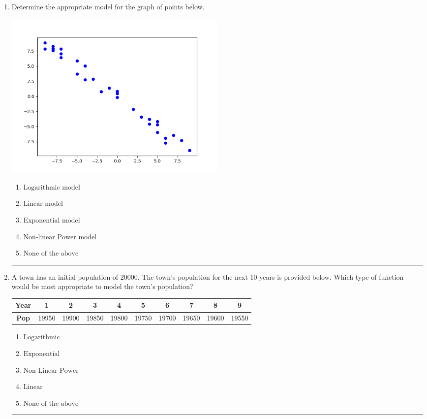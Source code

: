 \documentclass[14pt]{extbook}
\newcommand{\litem}[1]{\item#1\hspace*{-1cm}\rule{\textwidth}{0.4pt}}
\begin{document}
\begin{enumerate}
\litem{
Determine the appropriate model for the graph of points below.
\begin{center}
    \includegraphics[width=0.5\textwidth]{../Figures/identifyModelGraph11A.png}
\end{center}
\begin{enumerate}[label=\Alph*.]
\item \( \text{Logarithmic model} \)
\item \( \text{Linear model} \)
\item \( \text{Exponential model} \)
\item \( \text{Non-linear Power model} \)
\item \( \text{None of the above} \)

\end{enumerate} }
\litem{
A town has an initial population of 20000. The town's population for the next 10 years is provided below. Which type of function would be most appropriate to model the town's population?

\begin{tabular}{c|c|c|c|c|c|c|c|c|c}
\textbf{Year} &1 &2 &3 &4 &5 &6 &7 &8 &9\tabularnewline \hline
\textbf{Pop} &19950 &19900 &19850 &19800 &19750 &19700 &19650 &19600 &19550\end{tabular}\begin{enumerate}[label=\Alph*.]
\item \( \text{Logarithmic} \)
\item \( \text{Exponential} \)
\item \( \text{Non-Linear Power} \)
\item \( \text{Linear} \)
\item \( \text{None of the above} \)


\end{enumerate}}
\end{enumerate}
\end{document}
